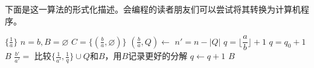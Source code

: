 下面是这一算法的形式化描述。会编程的读者朋友们可以尝试将其转换为计算机程序。

\begin{algorithmic}[1]
    \State \Return $\{\frac{1}{a}\}$
  \EndIf
  \State $n = b, B = \varnothing$
  \State $C = \{(\frac{b}{a}, \varnothing)\}$
    \State $(\frac{b}{a}, Q) \gets $   
    \State $n' = n - |Q|$                            
    \State $q = \lfloor \dfrac{a}{b} \rfloor + 1$
      
      \State $q = q_0 + 1$
    \EndIf
       
        \State \Return $B$
      \EndIf
      \State $\frac{b'}{a'} = $  
        \State 比较$\{\frac{1}{a'}, \frac{1}{q}\} \cup Q$和$B$，用$B$记录更好的分解
      \Else
        \State {} 
      \EndIf
      \State $q \gets q + 1$
    \EndWhile
  \EndWhile
  \State \Return $B$
\EndFunction
\end{algorithmic}





